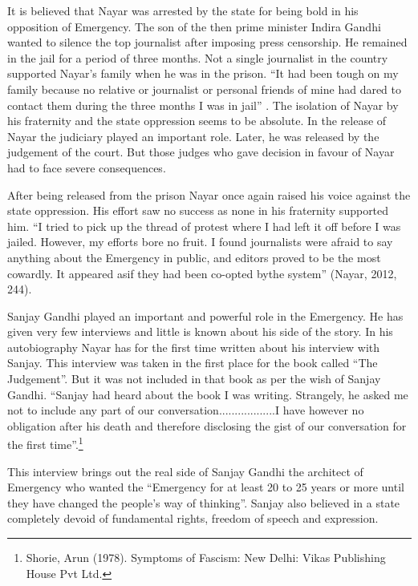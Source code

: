 \begin{multicols}{2}
\noi
It is believed that Nayar was arrested by the state for being bold in his opposition of Emergency.
The son of the then prime minister Indira Gandhi wanted to silence the top journalist after
imposing press censorship. He remained in the jail for a period of three months. Not a single
journalist in the country supported Nayar’s family when he was in the prison. “It had been
tough on my family because no relative or journalist or personal friends of mine had dared to contact them during the three months I was in jail” . The isolation of Nayar by his fraternity
and the state oppression seems to be absolute. In the release of Nayar the judiciary played an
important role. Later, he was released by the judgement of the court. But those judges who
gave decision in favour of Nayar had to face severe consequences.

\newpage

\noi
After being released from the prison Nayar once again raised his voice against the state
oppression. His effort saw no success as none in his fraternity supported him. “I tried to pick
up the thread of protest where I had left it off before I was jailed. However, my efforts bore no
fruit. I found journalists were afraid to say anything about the Emergency in public, and editors
proved to be the most cowardly. It appeared asif they had been co-opted bythe system” (Nayar,
2012, 244).

\noi
Sanjay Gandhi played an important and powerful role in the Emergency. He has given very
few interviews and little is known about his side of the story. In his autobiography Nayar has
for the first time written about his interview with Sanjay. This interview was taken in the first
place for the book called “The Judgement”. But it was not included in that book as per the wish
of Sanjay Gandhi. “Sanjay had heard about the book I was writing. Strangely, he asked me not
to include any part of our conversation..................I have however no obligation after his death
and therefore disclosing the gist of our conversation for the first time”.\footnote{Shorie, Arun (1978). Symptoms of Fascism: New Delhi: Vikas Publishing House Pvt Ltd.}

\noi
This interview brings out the real side of Sanjay Gandhi the architect of Emergency who
wanted the “Emergency for at least 20 to 25 years or more until they have changed the people’s
way of thinking”. Sanjay also believed in a state completely devoid of fundamental rights,
freedom of speech and expression.


\end{multicols}
